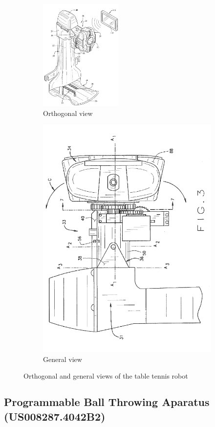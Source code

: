 \documentclass[12pt]{article}
\begin{document}
\begin{figure}[H]
    \centering
    \begin{subfigure}{0.4\textwidth}
        \centering
        \includegraphics[width=0.45\textwidth]{figures/patent3-1.png}
        \caption{Orthogonal view}
    \end{subfigure}
    \hfill
    \begin{subfigure}{0.4\textwidth}
        \centering
        \includegraphics[width=.45\textwidth]{figures/patent3-2.png}
        \caption{General view}
    \end{subfigure}
    \caption{Orthogonal and general views of the table tennis robot \cite{Thoman2022}}
\label{fig:patetn3-2}
\end{figure}

\subsection{Programmable Ball Throwing Aparatus (US008287.4042B2) \cite{Romulo2012}}
\end{document}
